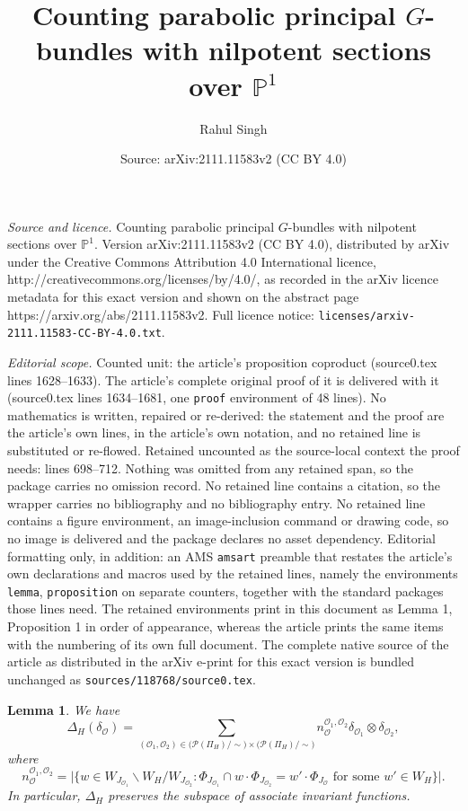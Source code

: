 \documentclass[10pt,a4paper]{amsart}
\title{Counting parabolic principal $G$-bundles with nilpotent sections over $\mathbb{P}^1$}
\author{Rahul Singh}
\date{Source: arXiv:2111.11583v2 (CC BY 4.0)}
\newtheorem{lemma}{Lemma}
\begin{document}
\maketitle

\noindent\emph{Source and licence.} Counting parabolic principal $G$-bundles with nilpotent sections over $\mathbb{P}^1$. Version arXiv:2111.11583v2 (CC BY 4.0), distributed by arXiv under the Creative Commons Attribution 4.0 International licence, http://creativecommons.org/licenses/by/4.0/, as recorded in the arXiv licence metadata for this exact version and shown on the abstract page https://arxiv.org/abs/2111.11583v2. Full licence notice: \texttt{licenses/arxiv-2111.11583-CC-BY-4.0.txt}.\par\smallskip

\noindent\textit{Editorial scope.} Counted unit: the article's proposition coproduct (source0.tex lines 1628--1633). The article's complete original proof of it is delivered with it (source0.tex lines 1634--1681, one \texttt{proof} environment of 48 lines). No mathematics is written, repaired or re-derived: the statement and the proof are the article's own lines, in the article's own notation, and no retained line is substituted or re-flowed.  Retained uncounted as the source-local context the proof needs: lines 698--712.  Nothing was omitted from any retained span, so the package carries no omission record.  No retained line contains a citation, so the wrapper carries no bibliography and no bibliography entry.  No retained line contains a figure environment, an image-inclusion command or drawing code, so no image is delivered and the package declares no asset dependency.  Editorial formatting only, in addition: an AMS \texttt{amsart} preamble that restates the article's own declarations and macros used by the retained lines, namely the environments \texttt{lemma}, \texttt{proposition} on separate counters, together with the standard packages those lines need.  The retained environments print in this document as Lemma 1, Proposition 1 in order of appearance, whereas the article prints the same items with the numbering of its own full document.  The complete native source of the article as distributed in the arXiv e-print for this exact version is bundled unchanged as \texttt{sources/118768/source0.tex}.
\begin{lemma}\label{associateinvariantdelta}
We have
\begin{equation}\label{lhsrhs}
\Delta_{H}(\delta_{\mathcal{O}})=\sum_{(\mathcal{O}_{1},\mathcal{O}_{2})\in\big(\mathcal{P}(\Pi_{H})/\sim\big)\times\big(\mathcal{P}(\Pi_{H})/\sim\big)}n_{\mathcal{O}}^{\mathcal{O}_{1},\mathcal{O}_{2}}\delta_{\mathcal{O}_{1}}\otimes \delta_{\mathcal{O}_{2}},
\end{equation}
where
\[
n_{\mathcal{O}}^{\mathcal{O}_{1},\mathcal{O}_{2}}
=
\big|\{w\in W_{J_{\mathcal{O}_{1}}}\backslash W_{H}/W_{J_{\mathcal{O}_{2}}}:\Phi_{J_{\mathcal{O}_{1}}}\cap w\cdot \Phi_{J_{\mathcal{O}_{2}}}=
w'\cdot\Phi_{J_{\mathcal{O}}}\text{ for some }w'\in W_H\}\big|.
\]
In particular, $\Delta_H$ preserves the subspace of associate invariant functions.
\end{lemma}
\end{document}

